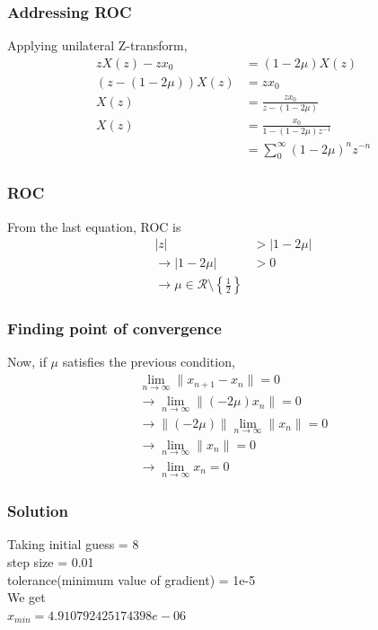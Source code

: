\documentclass{beamer}
\providecommand{\brak}[1]{\ensuremath{\left(#1\right)}}
\providecommand{\cbrak}[1]{\ensuremath{\left\{#1\right\}}}
\theoremstyle{remark}
\providecommand{\norm}[1]{\lVert#1\rVert}
\newcommand{\myvec}[1]{\ensuremath{\begin{pmatrix}#1\end{pmatrix}}}
\let\vec\mathbf
\numberwithin{equation}{section}
\begin{document}
\begin{frame}
\frametitle{Addressing ROC}
Applying unilateral Z-transform,
\begin{align}
    zX\brak{z} - zx_0 &= \brak{1-2\mu}X\brak{z}\\
    \brak{z - \brak{1-2\mu}}X\brak{z} &= zx_0\\
    X\brak{z} &= \frac{zx_0}{z - \brak{1-2\mu}}\\
    X\brak{z} &= \frac{x_0}{1 - \brak{1-2\mu}z^{-1}}\\
    &= \sum_{0}^{\infty} \brak{1-2\mu}^n z^{-n}
\end{align}


\end{frame}
\begin{frame}
\frametitle{ROC}
From the last equation, ROC is 
\begin{align}
    |z| &> |1-2\mu|\\
    \xrightarrow{} |1-2\mu| &> 0\\
    \xrightarrow{} \mu \in \mathcal{R} \setminus \cbrak{\frac{1}{2}}
\end{align}
\end{frame}
\begin{frame}
\frametitle{Finding point of convergence}
Now, if $\mu$ satisfies the previous condition,
\begin{align}
    \lim_{n \to \infty} \norm{x_{n+1} - x_n} = 0\\
    \xrightarrow{} \lim_{n \to \infty} \norm{\brak{-2\mu}x_n} = 0\\
    \xrightarrow{} \norm{\brak{-2\mu}}\lim_{n \to \infty} \norm{x_n} = 0\\
    \xrightarrow{} \lim_{n \to \infty} \norm{x_n} = 0\\
    \xrightarrow{} \lim_{n \to \infty} x_n = 0
\end{align}
\end{frame}
\begin{frame}
\frametitle{Solution}
Taking initial guess = 8\\ step size = 0.01\\ tolerance(minimum value of gradient) = 1e-5\\ We get \\
$x_{min} = 4.910792425174398e-06$\\
\end{frame}
\end{document}
